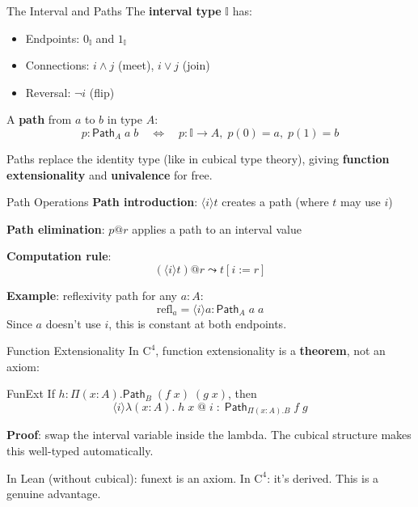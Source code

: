 \documentclass[aspectratio=169,11pt]{beamer}
\newcommand{\Cfour}{\mathrm{C}^4}
\newcommand{\Path}{\mathsf{Path}}
\newcommand{\interval}{\mathbb{I}}
\begin{document}
\begin{frame}{The Interval and Paths}
The \textbf{interval type} $\interval$ has:
\begin{itemize}
\item Endpoints: $0_\interval$ and $1_\interval$
\item Connections: $i \land j$ (meet), $i \lor j$ (join)
\item Reversal: $\lnot i$ (flip)
\end{itemize}

\vspace{0.5em}
A \textbf{path} from $a$ to $b$ in type $A$:
\[
p : \Path_A\;a\;b \quad \iff \quad p : \interval \to A, \; p(0) = a, \; p(1) = b
\]

\vspace{0.5em}
Paths replace the identity type (like in cubical type theory), giving \textbf{function extensionality} and \textbf{univalence} for free.
\end{frame}

\begin{frame}{Path Operations}
\textbf{Path introduction}: $\langle i \rangle t$ creates a path (where $t$ may use $i$)

\vspace{0.3em}
\textbf{Path elimination}: $p @ r$ applies a path to an interval value

\vspace{0.5em}
\textbf{Computation rule}:
\[
(\langle i \rangle t) @ r \leadsto t[i := r]
\]

\vspace{0.5em}
\textbf{Example}: reflexivity path for any $a : A$:
\[
\mathrm{refl}_a = \langle i \rangle a : \Path_A\;a\;a
\]
Since $a$ doesn't use $i$, this is constant at both endpoints.
\end{frame}

\begin{frame}{Function Extensionality}
In $\Cfour$, function extensionality is a \textbf{theorem}, not an axiom:

\begin{block}{FunExt}
If $h : \Pi(x:A).\Path_B\;(f\;x)\;(g\;x)$, then
\[
\langle i \rangle \lambda(x:A).\;h\;x\;@\;i \;:\; \Path_{\Pi(x:A).B}\;f\;g
\]
\end{block}

\vspace{0.5em}
\textbf{Proof}: swap the interval variable inside the lambda. The cubical structure makes this well-typed automatically.

\vspace{0.5em}
In Lean (without cubical): funext is an axiom. In $\Cfour$: it's derived. This is a genuine advantage.
\end{frame}
\end{document}
